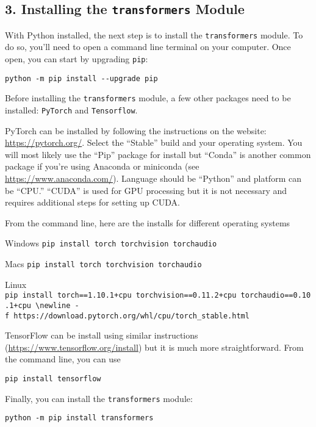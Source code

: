 \documentclass[
]{article}
\begin{document}
\hypertarget{installing-the-transformers-module}{%
\subsection{\texorpdfstring{3. Installing the \texttt{transformers}
Module}{3. Installing the transformers Module}}\label{installing-the-transformers-module}}

With Python installed, the next step is to install the
\texttt{transformers} module. To do so, you'll need to open a command
line terminal on your computer. Once open, you can start by upgrading
\texttt{pip}:

\texttt{python\ -m\ pip\ install\ -\/-upgrade\ pip}

Before installing the \texttt{transformers} module, a few other packages
need to be installed: \texttt{PyTorch} and \texttt{Tensorflow}.

PyTorch can be installed by following the instructions on the website:
\url{https://pytorch.org/}. Select the ``Stable'' build and your
operating system. You will most likely use the ``Pip'' package for
install but ``Conda'' is another common package if you're using Anaconda
or miniconda (see \url{https://www.anaconda.com/}). Language should be
``Python'' and platform can be ``CPU.'' ``CUDA'' is used for GPU
processing but it is not necessary and requires additional steps for
setting up CUDA.

From the command line, here are the installs for different operating
systems

Windows \newline \texttt{pip\ install\ torch\ torchvision\ torchaudio}

Macs \newline \texttt{pip\ install\ torch\ torchvision\ torchaudio}

Linux \newline
\texttt{pip\ install\ torch==1.10.1+cpu\ torchvision==0.11.2+cpu\ torchaudio==0.10.1+cpu\ \textbackslash{}newline\ -f\ https://download.pytorch.org/whl/cpu/torch\_stable.html}

TensorFlow can be install using similar instructions
(\url{https://www.tensorflow.org/install}) but it is much more
straightforward. From the command line, you can use

\texttt{pip\ install\ tensorflow}

Finally, you can install the \texttt{transformers} module:

\texttt{python\ -m\ pip\ install\ transformers}
\end{document}
